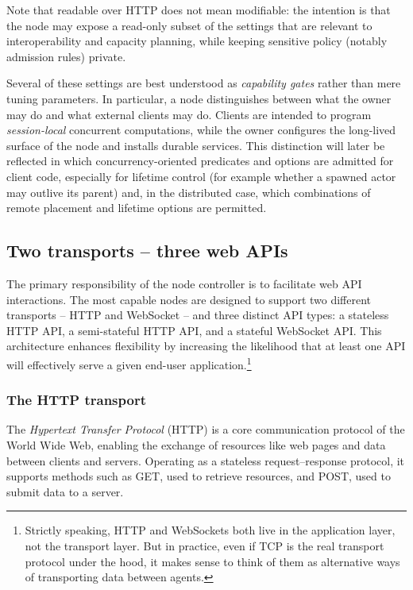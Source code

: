 \noindent Note that readable over HTTP does not mean modifiable: the intention is that the node may expose a read-only subset of the settings that are relevant to interoperability and capacity planning, while keeping sensitive policy (notably admission rules) private.

Several of these settings are best understood as \emph{capability gates} rather than mere tuning parameters. In particular, a node distinguishes between what the owner may do and what external clients may do. Clients are intended to program \emph{session-local} concurrent computations, while the owner configures the long-lived surface of the node and installs durable services. This distinction will later be reflected in which concurrency-oriented predicates and options are admitted for client code, especially for lifetime control (for example whether a spawned actor may outlive its parent) and, in the distributed case, which combinations of remote placement and lifetime options are permitted.

\subsection{Two transports -- three web APIs}\label{sec:transports-apis}

The primary responsibility of the node controller is to facilitate web API interactions. The most capable nodes are designed to support two different transports -- HTTP and WebSocket -- and three distinct API types: a stateless HTTP API, a semi-stateful HTTP API, and a stateful WebSocket API. This architecture enhances flexibility by increasing the likelihood that at least one API will effectively serve a given end-user application.\footnote{Strictly speaking, HTTP and WebSockets both live in the application layer, not the transport layer. But in practice, even if TCP is the real transport protocol under the hood, it makes sense to think of them as alternative ways of transporting data between agents.}


\subsubsection{The HTTP transport}\label{sec:http-transport}

The \textit{Hypertext Transfer Protocol} (HTTP) is a core communication protocol of the World Wide Web, enabling the exchange of resources like web pages and data between clients and servers. Operating as a stateless request--response protocol, it supports methods such as GET, used to retrieve resources, and POST, used to submit data to a server. 

